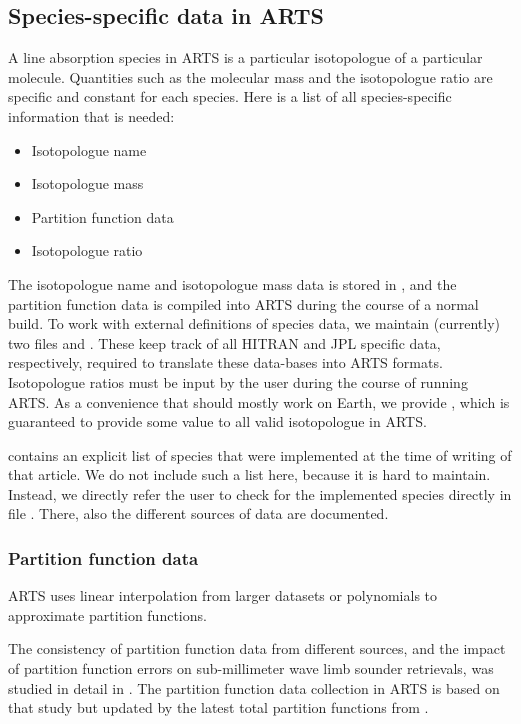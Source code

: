 \subsection{Species-specific data in ARTS}
\label{sec:abs_theory:species_data}

A line absorption species in ARTS is a particular isotopologue of a
particular molecule.  Quantities such as the molecular mass and the
isotopologue ratio are specific and constant for each species.  Here is a
list of all species-specific information that is needed:
\begin{itemize}
\item Isotopologue name
\item Isotopologue mass
\item Partition function data
\item Isotopologue ratio
\end{itemize}

The isotopologue name and isotopologue mass data is stored in ,
and the partition function data is compiled into ARTS during the course of a normal build.
To work with external definitions of species data, we maintain (currently)
two files  and .  These
keep track of all HITRAN and JPL specific data, respectively, required to translate
these data-bases into ARTS formats.
Isotopologue ratios must be input by the user during the course of running ARTS.
As a convenience that should mostly work on Earth, we provide 
, which is guaranteed to provide some
value to all valid isotopologue in ARTS.

\citet{buehler:artst:05} contains an explicit list of species that
were implemented at the time of writing of that article.  We do not include
such a list here, because it is hard to maintain. Instead, we directly refer
the user to check for the implemented species directly in file
. There, also the different sources of data
are documented.

\subsubsection{Partition function data}

ARTS uses linear interpolation from larger datasets or polynomials
to approximate partition functions.

The consistency of partition function data from different sources, and
the impact of partition function errors on sub-millimeter wave limb
sounder retrievals, was studied in detail in \citet{cverdes:05}. The
partition function data collection in ARTS is based on that study but updated
by the latest total partition functions from \citet{gamache:21}.

